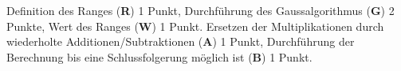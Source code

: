 \begin{bewertung}
Definition des Ranges ({\bf R}) 1 Punkt,
Durchführung des Gaussalgorithmus ({\bf G}) 2 Punkte,
Wert des Ranges ({\bf W}) 1 Punkt.
Ersetzen der Multiplikationen durch wiederholte Additionen/Subtraktionen
({\bf A}) 1 Punkt, Durchführung der Berechnung bis eine
Schlussfolgerung möglich ist ({\bf B}) 1 Punkt.
\end{bewertung}

